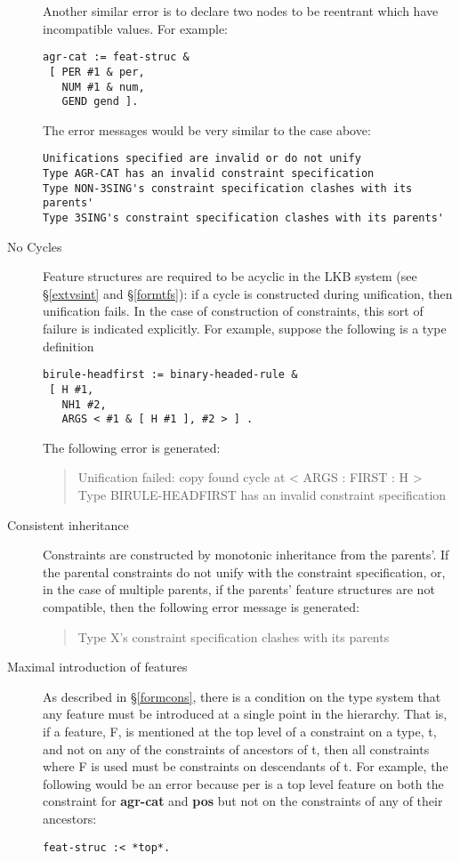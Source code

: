 \documentclass[12pt]{report}
\newenvironment{error}%
{\begin{quote}
\tt
}%
{\end{quote}
}
\begin{document}
\begin{description}
Another similar error is to declare two nodes to be reentrant which
have incompatible values.  For example:
\begin{verbatim}
agr-cat := feat-struc &
 [ PER #1 & per,
   NUM #1 & num,
   GEND gend ].
\end{verbatim}
The error messages would be very similar to the case above:
\begin{verbatim}
Unifications specified are invalid or do not unify
Type AGR-CAT has an invalid constraint specification
Type NON-3SING's constraint specification clashes with its parents'
Type 3SING's constraint specification clashes with its parents'
\end{verbatim}
\item[No Cycles] 
Feature structures are required to be acyclic
in the LKB system (see \S\ref{extvsint} and
\S\ref{formtfs}): if a cycle is constructed
during unification, then unification fails.  In the case
of construction of constraints, this sort of 
failure is indicated explicitly.
For example, suppose the following is a type definition
\begin{verbatim}
birule-headfirst := binary-headed-rule &
 [ H #1,
   NH1 #2,
   ARGS < #1 & [ H #1 ], #2 > ] .
\end{verbatim}
The following error is generated:
\begin{error}
Unification failed: copy found cycle at < ARGS : FIRST : H >\\
Type BIRULE-HEADFIRST has an invalid constraint specification
\end{error}
\item[Consistent inheritance]
Constraints are constructed by monotonic inheritance from 
the parents'.  If the parental constraints do not unify with
the constraint specification, or, in the case of multiple parents,
if the parents' feature structures are not compatible,
then the following error message is generated:
\begin{error}
Type X's constraint specification clashes with its parents
\end{error}
\item[Maximal introduction of features]
As described in \S\ref{formcons},
there is a condition on the type system that any feature
must be introduced at a single point in the hierarchy.
That is, if a feature, F, is mentioned at the top level of
a constraint on a type, t, and 
not on any of the constraints of
ancestors of t, then all constraints where
F is used must be constraints on descendants of t.
For example, the following would be an error because {\sc per}
is a top level feature on both the constraint for
{\bf agr-cat} and {\bf pos} but not on the constraints
of any of their ancestors:
\begin{verbatim}
feat-struc :< *top*.


\end{verbatim}
\end{description}
\end{document}
